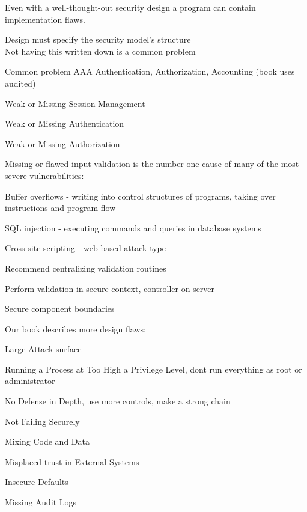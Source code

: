 \documentclass[Screen16to9,17pt]{foils}
\begin{document}
Even with a well-thought-out security design a program can contain implementation flaws.


\begin{list2}
\item Design must specify the security model's structure\\
Not having this written down is a common problem
\item Common problem AAA Authentication, Authorization, Accounting (book uses audited)
\item Weak or Missing Session Management
\item Weak or Missing Authentication
\item Weak or Missing Authorization
\end{list2}



Missing or flawed input validation is the number one cause of many of the most severe vulnerabilities:
\begin{list2}
\item Buffer overflows - writing into control structures of programs, taking over instructions and program flow
\item SQL injection - executing commands and queries in database systems
\item Cross-site scripting - web based attack type
\item Recommend centralizing validation routines
\item Perform validation in secure context, controller on server
\item Secure component boundaries
\end{list2}


Our book describes more design flaws:
\begin{list2}
\item Large Attack surface
\item Running a Process at Too High a Privilege Level, dont run everything as root or administrator
\item No Defense in Depth, use more controls, make a strong chain
\item Not Failing Securely
\item Mixing Code and Data
\item Misplaced trust in External Systems
\item Insecure Defaults
\item Missing Audit Logs
\end{list2}
\end{document}

